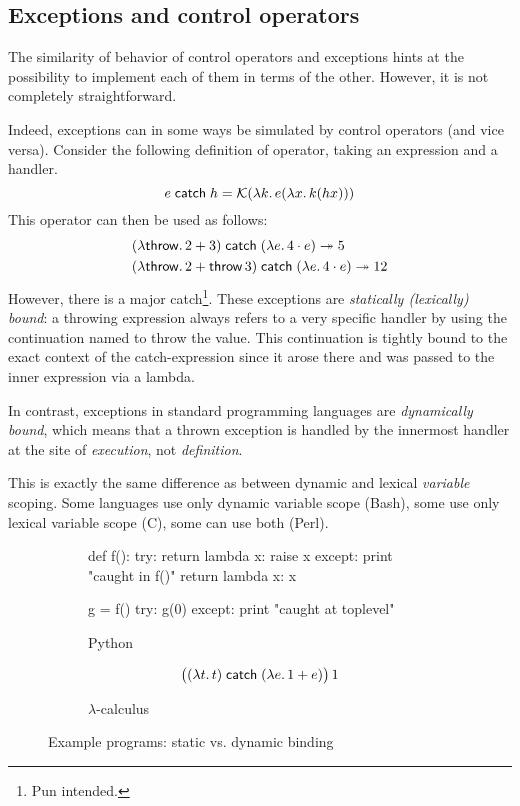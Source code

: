 \subsection{Exceptions and control operators}

The similarity of behavior of control operators and exceptions hints at the possibility
to implement each of them in terms of the other. However, it is not completely
straightforward.

Indeed, exceptions can in some ways be simulated by control operators (and vice versa).
Consider the following definition of  operator, taking an expression
and a handler.
\[	e \;\mathsf{catch}\; h = \mathcal{K}(\lambda k.\, e (\lambda x.\, k(h x))) \]
This operator can then be used as follows:
\begin{align*}
	&(\lambda \mathsf{throw}.\, 2 + 3) \;\mathsf{catch}\; (\lambda e.\, 4 \cdot e) \twoheadrightarrow 5 \\
	&(\lambda \mathsf{throw}.\, 2 + \mathsf{throw}\,3) \;\mathsf{catch}\; (\lambda e.\, 4 \cdot e) \twoheadrightarrow 12
\end{align*}
However, there is a major catch\footnote{Pun intended.}. These exceptions are \emph{statically
(lexically) bound}: a throwing expression always refers to a very specific handler
by using the continuation named  to throw the value. This continuation
is tightly bound to the exact context of the catch-expression since it arose there
and was passed to the inner expression via a lambda.

In contrast, exceptions in standard programming languages are \emph{dynamically bound}, which
means that a thrown exception is handled by the innermost handler at the site of \emph{execution},
not \emph{definition}.

This is exactly the same difference as between dynamic and lexical \emph{variable} scoping. Some
languages use only dynamic variable scope (Bash), some use only lexical variable scope (C),
some can use both (Perl).

\begin{figure}
\centering
\begin{subfigure}{0.45\textwidth}
\begin{codepy}
  def f():
    try:
      return lambda x: raise x
    except:
      print "caught in f()"
      return lambda x: x
      
  g = f()
  try:
    g(0)
  except:
    print "caught at toplevel"
\end{codepy}
\caption{Python}\label{fig:svd-python}
\end{subfigure}
\begin{subfigure}{0.45\textwidth}
\[ \big((\lambda t.\, t)\;\mathsf{catch}\;(\lambda e.\, 1 + e)\big)\, 1 \]
\caption{$\lambda$-calculus}\label{fig:svd-lc}
\end{subfigure}
\caption{Example programs: static vs. dynamic binding}
\end{figure}

